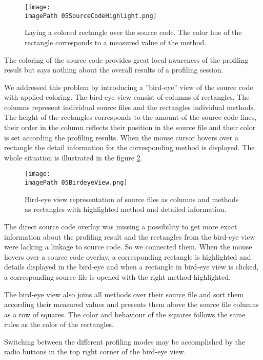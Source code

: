 \begin{figure}
	\centering
		\texttt{[image: \\imagePath 05SourceCodeHighlight.png]}
		\caption{Laying a colored rectangle over the source code. The color hue of the rectangle corresponds to a measured value of the method. }
	\label{fig:05SourceCodeHighlight}
\end{figure}

The coloring of the source code provides great local awareness of the profiling result but says nothing about the overall results of a profiling session. 

We addressed this problem by introducing a ''bird-eye'' view of the source code with applied coloring. The bird-eye view consist of columns of rectangles. The columns represent individual source files and the rectangles individual methods. The height of the rectangles corresponds to the amount of the source code lines, their order in the column reflects their position in the source file and their color is set according the profiling results.
When the mouse cursor hovers over a rectangle the detail information for the corresponding method is displayed. The whole situation is illustrated in the figure \ref{fig:05BirdeyeView}.

\begin{figure}
	\centering
		\texttt{[image: \\imagePath 05BirdeyeView.png]}
		\caption{Bird-eye view representation of source files as columns and methods as rectangles with highlighted method and detailed information. }
	\label{fig:05BirdeyeView}
\end{figure}

The direct source code overlay was missing a possibility to get more exact information about the profiling result and the rectangles from the bird-eye view were lacking a linkage to source code. So we connected them. When the mouse hovers over a source code overlay, a corresponding rectangle is highlighted and details displayed in the bird-eye and when a rectangle in bird-eye view is clicked, a corresponding source file is opened  with the right method highlighted. 

The bird-eye view also joins all methods over their source file and sort them according their measured values and presents them above the source file columns as a row of squares. The color and behaviour of the squares follows the same rules as the color of the rectangles.

Switching between the different profiling modes may be accomplished by the radio buttons in the top right corner of the bird-eye view.

